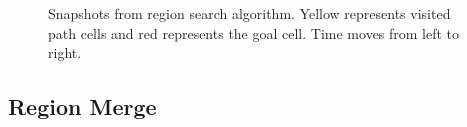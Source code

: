 \begin{figure}[H]
\centering
            \hfill
            \hfill
            \hfill
            \hfill
            \hfill
            \hfill
            \caption{Snapshots from region search algorithm. Yellow represents visited path cells and red represents the goal cell. Time moves from left to right.}
\label{fig:region-search}
\end{figure}

\subsection{Region Merge}


